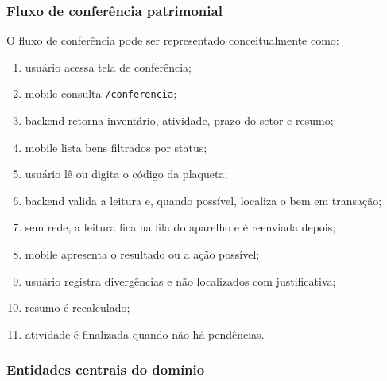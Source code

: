\documentclass[12pt,a4paper]{article}
\begin{document}
\subsubsection{Fluxo de conferência patrimonial}

O fluxo de conferência pode ser representado conceitualmente como:

\begin{enumerate}
    \item usuário acessa tela de conferência;
    \item mobile consulta \texttt{/conferencia};
    \item backend retorna inventário, atividade, prazo do setor e resumo;
    \item mobile lista bens filtrados por status;
    \item usuário lê ou digita o código da plaqueta;
    \item backend valida a leitura e, quando possível, localiza o bem em transação;
    \item sem rede, a leitura fica na fila do aparelho e é reenviada depois;
    \item mobile apresenta o resultado ou a ação possível;
    \item usuário registra divergências e não localizados com justificativa;
    \item resumo é recalculado;
    \item atividade é finalizada quando não há pendências.
\end{enumerate}

\subsubsection{Entidades centrais do domínio}
\end{document}
